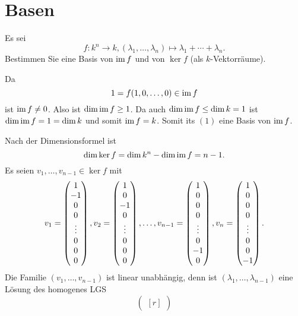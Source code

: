 \section{Basen}


\begin{question}
 Es sei
 \[
  f \colon k^n \to k, (\lambda_1, \dotsc, \lambda_n) \mapsto \lambda_1 + \dotsb + \lambda_n.
 \]
 Bestimmen Sie eine Basis von $\operatorname{im} f$ und von $\ker f$ (als $k$-Vektorräume).
\end{question}
\begin{solution}
 Da
 \[
  1 = f(1, 0, \dotsc, 0) \in \operatorname{im} f
 \]
 ist $\operatorname{im} f \neq 0$. Also ist $\dim \operatorname{im} f \geq 1$. Da auch $\dim \operatorname{im} f \leq \dim k = 1$ ist $\dim \operatorname{im} f = 1 = \dim k$ und somit $\operatorname{im} f = k$. Somit its $(1)$ eine Basis von $\operatorname{im} f$.
 
 Nach der Dimensionsformel ist
 \[
  \dim \ker f = \dim k^n - \dim \operatorname{im} f = n-1.
 \]
 Es seien $v_1, \dotsc, v_{n-1} \in \ker f$ mit
 \begin{align*}
  v_1 = \begin{pmatrix}1 \\ -1 \\  0 \\ 0 \\ \vdots \\ 0 \\ 0 \\ 0\end{pmatrix},
  v_2 = \begin{pmatrix}1 \\  0 \\ -1 \\ 0 \\ \vdots \\ 0 \\ 0 \\ 0\end{pmatrix},
  \dotsc,
  v_{n-1} = \begin{pmatrix}1 \\ 0 \\ 0 \\ 0 \\ \vdots \\ 0 \\ -1 \\ 0\end{pmatrix},
  v_n = \begin{pmatrix}1 \\ 0 \\ 0 \\ 0 \\ \vdots \\ 0 \\ 0 \\ -1\end{pmatrix}.
 \end{align*}
 Die Familie $(v_1, \dotsc, v_{n-1})$ ist linear unabhängig, denn ist $(\lambda_1, \dotsc, \lambda_{n-1})$ eine Lösung des homogenes LGS
 \[
  \begin{pmatrix*}[r]

\end{pmatrix*}\]
\end{solution}
